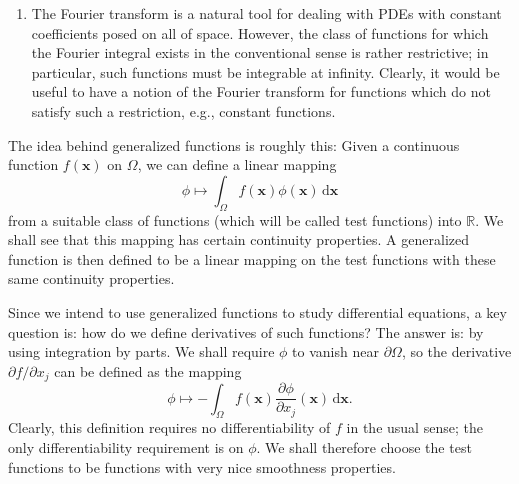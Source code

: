 \begin{enumerate}
\item The Fourier transform is a natural tool for dealing with PDEs with constant coefficients posed on all of space. However, the class of functions for which the Fourier integral exists in the conventional sense is rather restrictive; in particular, such functions must be integrable at infinity. Clearly, it would be useful to have a notion of the Fourier transform for functions which do not satisfy such a restriction, e.g., constant functions.
\end{enumerate}

The idea behind generalized functions is roughly this: Given a continuous function $f(\bm{x})$ on $\Omega$, we can define a linear mapping
\begin{equation}\label{eq:function-induced-test-functional}
\phi\mapsto\int_\Omega f(\bm{x})\phi(\bm{x})\,\mathrm{d}\bm{x}
\end{equation}
from a suitable class of functions (which will be called test functions) into $\mathbb{R}$. We shall see that this mapping has certain continuity properties. A generalized function is then defined to be a linear mapping on the test functions with these same continuity properties.

Since we intend to use generalized functions to study differential equations, a key question is: how do we define derivatives of such functions? The answer is: by using integration by parts. We shall require $\phi$ to vanish near $\partial\Omega$, so the derivative $\partial f/\partial x_j$ can be defined as the mapping
\begin{equation}\label{eq:distribution-derivative-motivating-pairing}
\phi\mapsto-\int_\Omega f(\bm{x})\dfrac{\partial\phi}{\partial x_j}(\bm{x})\,\mathrm{d}\bm{x}.
\end{equation}
Clearly, this definition requires no differentiability of $f$ in the usual sense; the only differentiability requirement is on $\phi$. We shall therefore choose the test functions to be functions with very nice smoothness properties.
